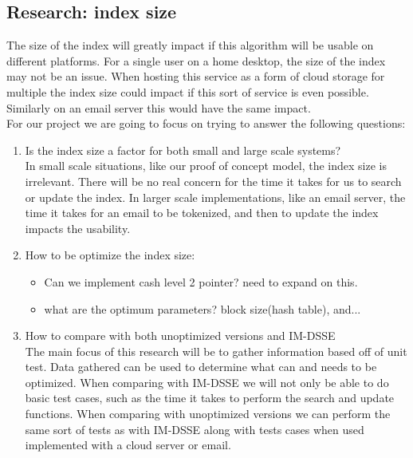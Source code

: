 \documentclass[onecolumn, draftclsnofoot,10pt, compsoc]{IEEEtran}
\begin{document}
\subsection{ Research: index size }
\label{subsec:size}

The size of the index will greatly impact if this algorithm will be usable on different platforms. For a single user on a home desktop, the size of the index may not be an issue. When hosting this service as a form of cloud storage for multiple the index size could impact if this sort of service is even possible. Similarly on an email server this would have the same impact. \\

For our project we are going to focus on trying to answer the following questions:

\begin{enumerate}
	\item Is the index size a factor for both small and large scale systems? \\
In small scale situations, like our proof of concept model, the index size is irrelevant. There will be no real concern for the time it takes for us to search or update the index. In larger scale implementations, like an email server, the time it takes for an email to be tokenized, and then to update the index impacts the usability.

	\item How to be optimize the index size:
    \begin{itemize}
		\item Can we implement cash level 2 pointer? need to expand on this.
		\item what are the optimum parameters? block size(hash table), and...
    \end{itemize}
	\item How to compare with both unoptimized versions and IM-DSSE\\
The main focus of this research will be to gather information based off of unit test. Data gathered can be used to determine what can and needs to be optimized. When comparing with IM-DSSE we will not only be able to do basic test cases, such as the time it takes to perform the search and update functions. When comparing with unoptimized versions we can perform the same sort of tests as with IM-DSSE along with tests cases when used implemented with a cloud server or email.
\end{enumerate}
\end{document}
